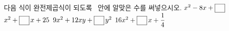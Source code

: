 다음 식이 완전제곱식이 되도록 \blank\ 안에 알맞은 수를 써넣으시오.
 $x^2-8x+\blank$
 $x^2+\blank\mkern3mu x+25$
 $9x^2+12xy+\blank\mkern3mu y^2$
 $16x^2+\blank\mkern3mu x+\dfrac{1}{4}$

